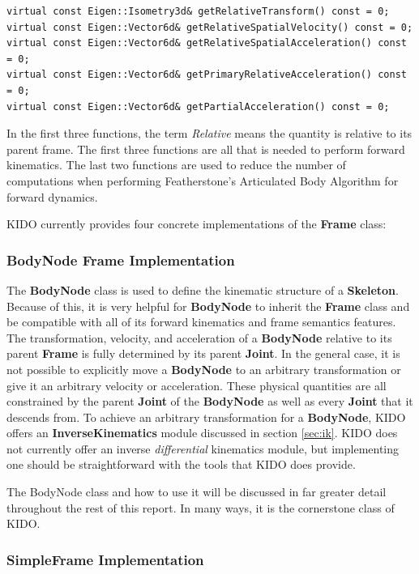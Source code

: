 \begin{lstlisting}
virtual const Eigen::Isometry3d& getRelativeTransform() const = 0;
virtual const Eigen::Vector6d& getRelativeSpatialVelocity() const = 0;
virtual const Eigen::Vector6d& getRelativeSpatialAcceleration() const = 0;
virtual const Eigen::Vector6d& getPrimaryRelativeAcceleration() const = 0;
virtual const Eigen::Vector6d& getPartialAcceleration() const = 0;
\end{lstlisting}

In the first three functions, the term \textit{Relative} means the quantity is relative to its parent frame. The first three functions are all that is needed to perform forward kinematics. The last two functions are used to reduce the number of computations when performing Featherstone's Articulated Body Algorithm for forward dynamics.

KIDO currently provides four concrete implementations of the \textbf{Frame} class:

\subsubsection{BodyNode Frame Implementation}

The \textbf{BodyNode} class is used to define the kinematic structure of a \textbf{Skeleton}. Because of this, it is very helpful for \textbf{BodyNode} to inherit the \textbf{Frame} class and be compatible with all of its forward kinematics and frame semantics features. The transformation, velocity, and acceleration of a \textbf{BodyNode} relative to its parent \textbf{Frame} is fully determined by its parent \textbf{Joint}. In the general case, it is not possible to explicitly move a \textbf{BodyNode} to an arbitrary transformation or give it an arbitrary velocity or acceleration. These physical quantities are all constrained by the parent \textbf{Joint} of the \textbf{BodyNode} as well as every \textbf{Joint} that it descends from. To achieve an arbitrary transformation for a \textbf{BodyNode}, KIDO offers an \textbf{InverseKinematics} module discussed in section \ref{sec:ik}. KIDO does not currently offer an inverse \textit{differential} kinematics module, but implementing one should be straightforward with the tools that KIDO does provide.

The BodyNode class and how to use it will be discussed in far greater detail throughout the rest of this report. In many ways, it is the cornerstone class of KIDO.

\subsubsection{SimpleFrame Implementation}

